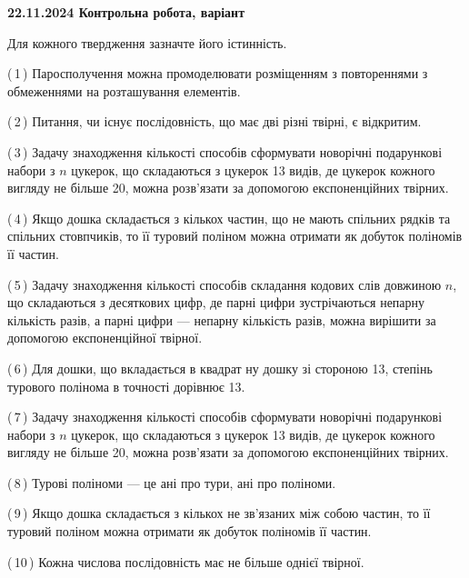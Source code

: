 \documentclass[12pt, ukrainian]{article}
\begin{document}
\begin {large}
\begin {large}
\begin {large}
\begin {large}
\begin {large}
\begin {large}
\begin {large}
\begin {large}
\begin {large}
\begin {large}
\begin {large}
\begin {large}
\begin {large}
\begin {large}
\begin {large}
\begin {large}
\begin {large}
\begin {large}
\begin {large}
\begin {large}
\begin {large}
\textbf{22.11.2024 Контрольна робота, варіант  }\par


{
Для кожного твердження зазначте його істинність.\par

\vspace{2mm}

(\,1\,) Паросполучення можна промоделювати розміщенням з повтореннями з обмеженнями на розташування елементів.%



(\,2\,) Питання, чи існує послідовність, що має дві різні твірні, є відкритим.%



(\,3\,) Задачу знаходження кількості способів сформувати новорічні подарункові набори з $n$ цукерок, що складаються з цукерок 13 видів, де цукерок кожного вигляду не більше 20, можна розв’язати за допомогою експоненційних твірних.%



(\,4\,) Якщо дошка складається з кількох частин, що не мають спільних рядків та спільних стовпчиків, то її туровий поліном можна отримати як добуток поліномів її частин.%



(\,5\,) Задачу знаходження кількості способів складання кодових слів довжиною $n$, що складаються з десяткових цифр, де парні цифри зустрічаються непарну кількість разів, а парні цифри — непарну кількість разів, можна вирішити за допомогою експоненційної твірної.%



(\,6\,) Для дошки, що вкладається в квадрат ну дошку зі стороною 13, степінь турового полінома в точності дорівнює 13.%



(\,7\,) Задачу знаходження кількості способів сформувати новорічні подарункові набори з $n$ цукерок, що складаються з цукерок 13 видів, де цукерок кожного вигляду не більше 20, можна розв’язати за допомогою експоненційних твірних.%



(\,8\,) Турові поліноми --- це ані про тури, ані про поліноми.%



(\,9\,) Якщо дошка складається з кількох не зв’язаних між собою частин, то її туровий поліном можна отримати як добуток поліномів її частин.%



(\,10\,) Кожна числова послідовність має не більше однієї твірної.%




}
\end{large}
\end{large}
\end{large}
\end{large}
\end{large}
\end{large}
\end{large}
\end{large}
\end{large}
\end{large}
\end{large}
\end{large}
\end{large}
\end{large}
\end{large}
\end{large}
\end{large}
\end{large}
\end{large}
\end{large}
\end{large}
\end{document}
